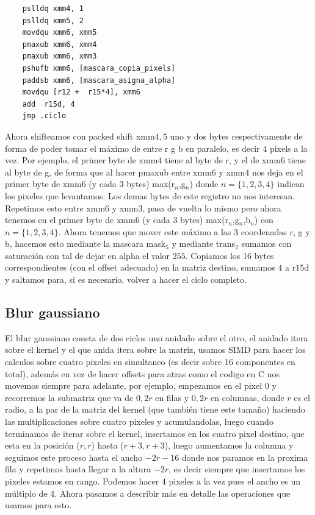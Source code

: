 \documentclass[a4paper]{article}
\begin{document}
\begin{codesnippet}
\begin{verbatim}
    pslldq xmm4, 1                  
    pslldq xmm5, 2               
    movdqu xmm6, xmm5             
    pmaxub xmm6, xmm4             
    pmaxub xmm6, xmm3              
    pshufb xmm6, [mascara_copia_pixels] 
    paddsb xmm6, [mascara_asigna_alpha]
    movdqu [r12 +  r15*4], xmm6
    add  r15d, 4
    jmp .ciclo
\end{verbatim}
\end{codesnippet}

 Ahora shifteamos con packed shift xmm$4,5$ uno y dos bytes respectivamente de forma de poder tomar el máximo de entre r g b en paralelo, es decir $4$ pixels a la vez. Por ejemplo, el primer byte de xmm$4$ tiene al byte de r, y el de xmm$6$ tiene al byte de g, de forma que al hacer pmaxub entre  xmm$6$ y xmm$4$ nos deja en el primer byte de xmm$6$ (y cada 3 bytes) max(r$_n$,g$_n$) donde $n = \{1,2,3,4 \}$ indican los pixeles que levantamos. Los demas bytes de este registro no nos interesan. Repetimos esto entre xmm$6$ y xmm$3$, pasa de vuelta lo mismo pero ahora tenemos en el primer byte de xmm$6$ (y cada $3$ bytes) max(r$_n$,g$_n$,b$_n$) con $n = \{1,2,3,4 \}$. Ahora tenemos que mover este máximo a las 3 coordenadas r, g y b, hacemos esto mediante la mascara mask$_5$ y mediante trans$_2$ sumamos con saturación con tal de dejar en alpha el valor $255$. Copiamos los 16 bytes correspondientes (con el offset adecuado) en la matriz destino, sumamos $4$ a r$15$d y saltamos para, si es necesario, volver a hacer el ciclo completo.


\subsection{Blur gaussiano}

 El blur gaussiano consta de dos ciclos uno anidado sobre el otro, el anidado itera sobre el kernel y el que anida itera sobre la matriz, usamos SIMD para hacer los calculos sobre cuatro pixeles en simultaneo (es decir sobre 16 componentes en total), además en vez de hacer offsets para atras como el codigo en C nos movemos siempre para adelante, por ejemplo, empezamos en el pixel $0$ y recorremos la submatriz que va de $0, 2r$ en filas y $0, 2r$ en columnas, donde $r$ es el radio, a la par de la matriz del kernel (que también tiene este tamaño) haciendo las multiplicaciones sobre cuatro pixeles y acumulandolas, luego cuando terminamos de iterar sobre el kernel, insertamos en los cuatro pixel destino, que esta en la posición ($r, r$) hasta ($r+3, r+3$), luego aumentamos la columna y seguimos este proceso hasta el ancho $- 2r - 16$ donde nos paramos en la proxima fila y repetimos hasta llegar a la altura $- 2r$, es decir siempre que insertamos los pixeles estamos en rango. Podemos hacer 4 pixeles a la vez pues el ancho es un múltiplo de 4. Ahora pasamos a describir más en detalle las operaciones que usamos para esto. \newline
 
\end{document}
